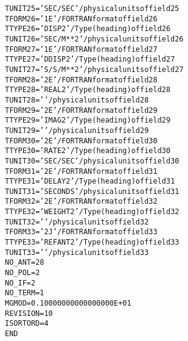 \documentclass[twoside]{article}
\begin{document}
\begin{alltt}
TUNIT25 = 'SEC/SEC '           / physical units of field 25
TFORM26 = '1E      '           / FORTRAN format of field 26
TTYPE26 = 'DISP 2          '   / Type (heading) of field 26
TUNIT26 = 'SEC/M**2'           / physical units of field 26
TFORM27 = '1E      '           / FORTRAN format of field 27
TTYPE27 = 'DDISP 2         '   / Type (heading) of field 27
TUNIT27 = 'S/S/M**2'           / physical units of field 27
TFORM28 = '2E      '           / FORTRAN format of field 28
TTYPE28 = 'REAL2           '   / Type (heading) of field 28
TUNIT28 = '        '           / physical units of field 28
TFORM29 = '2E      '           / FORTRAN format of field 29
TTYPE29 = 'IMAG2           '   / Type (heading) of field 29
TUNIT29 = '        '           / physical units of field 29
TFORM30 = '2E      '           / FORTRAN format of field 30
TTYPE30 = 'RATE 2          '   / Type (heading) of field 30
TUNIT30 = 'SEC/SEC '           / physical units of field 30
TFORM31 = '2E      '           / FORTRAN format of field 31
TTYPE31 = 'DELAY 2         '   / Type (heading) of field 31
TUNIT31 = 'SECONDS '           / physical units of field 31
TFORM32 = '2E      '           / FORTRAN format of field 32
TTYPE32 = 'WEIGHT 2        '   / Type (heading) of field 32
TUNIT32 = '        '           / physical units of field 32
TFORM33 = '2J      '           / FORTRAN format of field 33
TTYPE33 = 'REFANT 2        '   / Type (heading) of field 33
TUNIT33 = '        '           / physical units of field 33
NO_ANT  =           28
NO_POL  =            2
NO_IF   =            2
NO_TERM =            1
MGMOD   =   0.10000000000000000E+01
REVISION=           10
ISORTORD=                   4
END
\end{alltt}
\end{document}
